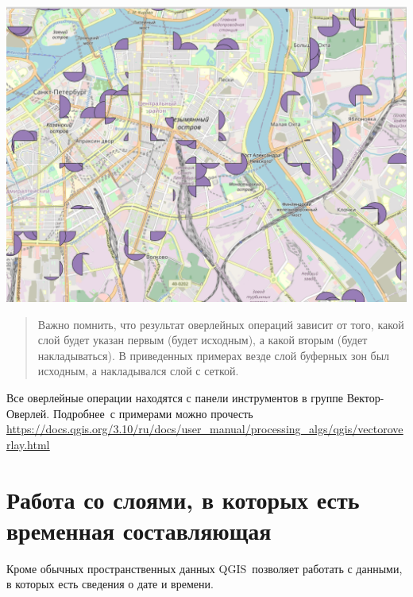 \documentclass[
]{book}
\begin{document}
\includegraphics{figures/58.PNG}

\begin{quote}
Важно помнить, что результат оверлейных операций зависит от того, какой слой будет указан первым (будет исходным), а какой вторым (будет накладываться). В приведенных примерах везде слой буферных зон был исходным, а накладывался слой с сеткой.
\end{quote}

Все оверлейные операции находятся с панели инструментов в группе Вектор-Оверлей. Подробнее~с примерами можно прочесть \href{https://docs.qgis.org/3.10/ru/docs/user_manual/processing_algs/qgis/vectoroverlay.html}{\underline{https://docs.qgis.org/3.10/ru/docs/user\_manual/processing\_algs/qgis/vectoroverlay.html}}

\hypertarget{ux440ux430ux431ux43eux442ux430-ux441ux43e-ux441ux43bux43eux44fux43cux438-ux432-ux43aux43eux442ux43eux440ux44bux445-ux435ux441ux442ux44c-ux432ux440ux435ux43cux435ux43dux43dux430ux44f-ux441ux43eux441ux442ux430ux432ux43bux44fux44eux449ux430ux44f}{%
\chapter{Работа со слоями, в которых есть временная составляющая}\label{ux440ux430ux431ux43eux442ux430-ux441ux43e-ux441ux43bux43eux44fux43cux438-ux432-ux43aux43eux442ux43eux440ux44bux445-ux435ux441ux442ux44c-ux432ux440ux435ux43cux435ux43dux43dux430ux44f-ux441ux43eux441ux442ux430ux432ux43bux44fux44eux449ux430ux44f}}

Кроме обычных пространственных данных QGIS~позволяет работать с данными, в которых есть сведения о дате и времени.
\end{document}
